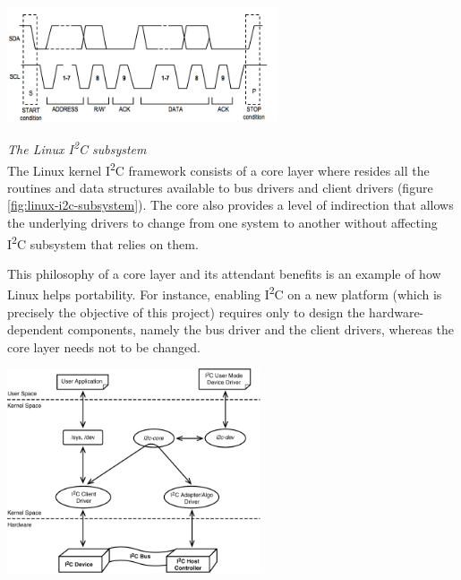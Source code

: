 \documentclass[a4paper,10pt]{article}
\makeatletter
\newenvironment{figurehere}{\def\@captype{figure}\vspace{2ex}}{\vspace{2ex}}
\newcommand{\iic}{I\textsuperscript{2}C }
\makeatother
\begin{document}
\begin{multicols}{2}
\begin{figurehere}
 \centering
 \includegraphics[width=8cm]{./figures/i2c-transaction.jpg}
 \caption{Sample \iic transaction (adapted from \emph{www.ermicro/blog}).}
 \label{fig:i2c-transaction}
\end{figurehere}

\emph{The Linux \iic subsystem}\\[6pt]
The Linux kernel \iic framework consists of a core layer where resides all the
routines and data structures available to bus drivers and client drivers
(figure \ref{fig:linux-i2c-subsystem}).
The core also provides a level of indirection that allows the underlying drivers
to change from one system to another without affecting \iic subsystem that
relies on them.

This philosophy of a core layer and its attendant benefits is an example of how
Linux helps portability. For instance, enabling \iic on a new platform (which is
precisely the objective of this project) requires only to design the
hardware-dependent components, namely the bus driver and the client drivers,
whereas the core layer needs not to be changed.

\begin{figurehere}
 \centering
 \includegraphics[width=7.5cm]{./figures/linux-i2c-subsystem.png}
 \caption{The Linux \iic subsystem (reprinted from \cite{venkateswaran2008eldd},
 		p. 236).}
 \label{fig:linux-i2c-subsystem}
\end{figurehere}




\end{multicols}
\end{document}
